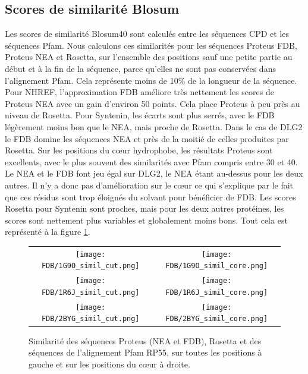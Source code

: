 \subsection{Scores de similarité Blosum}
Les scores de similarité Blosum40 sont calculés entre les séquences CPD et les séquences Pfam. Nous calculons ces similarités pour les séquences Proteus FDB, Proteus NEA et Rosetta, sur l'ensemble des positions sauf une petite partie au début et à la fin de la séquence, parce qu'elles ne sont pas conservées dans l'alignement Pfam. Cela représente moins de 10\% de la longueur de la séquence. Pour NHREF, l'approximation FDB améliore très nettement les scores de Proteus NEA avec un gain d'environ 50 points. Cela place Proteus à peu près au niveau de Rosetta. Pour Syntenin, les écarts sont plus serrés, avec le FDB légèrement moins bon que le NEA, mais proche de Rosetta. Dans le cas de DLG2 le FDB domine les séquences NEA et près de la moitié de celles produites par Rosetta. Sur les positions du cœur hydrophobe, les résultats Proteus sont excellents, avec le plus souvent des similarités avec Pfam compris entre 30 et 40. Le NEA et le FDB font jeu égal sur DLG2, le NEA étant au-dessus pour les deux autres. Il n'y a donc pas d'amélioration sur le cœur ce qui s'explique par le fait que ces résidus sont trop éloignés du solvant pour bénéficier de FDB. Les scores Rosetta pour Syntenin sont proches, mais pour les deux autres protéines, les scores sont nettement plus variables et globalement moins bons. Tout cela est représenté à la figure  \ref{graph:Simil_3prot}.

   \begin{figure}[t]
     \centering
     \begin{tabular}{cc} 
       \texttt{[image: FDB/1G9O\_simil\_cut.png]} &
       \texttt{[image: FDB/1G9O\_simil\_core.png]} \\
       \texttt{[image: FDB/1R6J\_simil\_cut.png]} &
       \texttt{[image: FDB/1R6J\_simil\_core.png]} \\
       \texttt{[image: FDB/2BYG\_simil\_cut.png]} &
       \texttt{[image: FDB/2BYG\_simil\_core.png]} \\
     \end{tabular}
     \caption{Similarité des séquences Proteus (NEA et FDB), Rosetta et des séquences de l'alignement Pfam RP55, sur toutes les positions à gauche et sur les positions du cœur à droite.}

     \label{graph:Simil_3prot}
   \end{figure}

